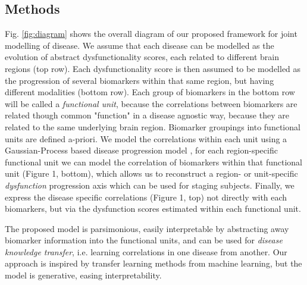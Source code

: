 \documentclass{llncs}
\begin{document}
\subsection{Methods}

Fig. \ref{fig:diagram} shows the overall diagram of our proposed framework for joint modelling of disease. We assume that each disease can be modelled as the evolution of abstract dysfunctionality scores, each related to different brain regions (top row). Each dysfunctionality score is then assumed to be modelled as the progression of several biomarkers within that same region, but having different modalities (bottom row). Each group of biomarkers in the bottom row will be called a \emph{functional unit}, because the correlations between biomarkers are related though common "function" in a disease agnostic way, because they are related to the same underlying brain region. Biomarker groupings into functional units are defined a-priori. We model the correlations within each unit using a Gaussian-Process based disease progression model \cite{lorenzi2017disease}, for each region-specific functional unit we can model the correlation of biomarkers within that functional unit (Figure 1, bottom), which allows us to reconstruct a region- or unit-specific \emph{dysfunction} progression axis which can be used for staging subjects. Finally, we express the disease specific correlations (Figure 1, top) not directly with each biomarkers, but via the dysfunction scores estimated within each functional unit.  

The proposed model is parsimonious, easily interpretable by abstracting away biomarker information into the functional units, and can be used for \emph{disease knowledge transfer}, i.e. learning correlations in one disease from another. Our approach is inspired by transfer learning methods from machine learning, but the model is generative, easing interpretability.
\end{document}
